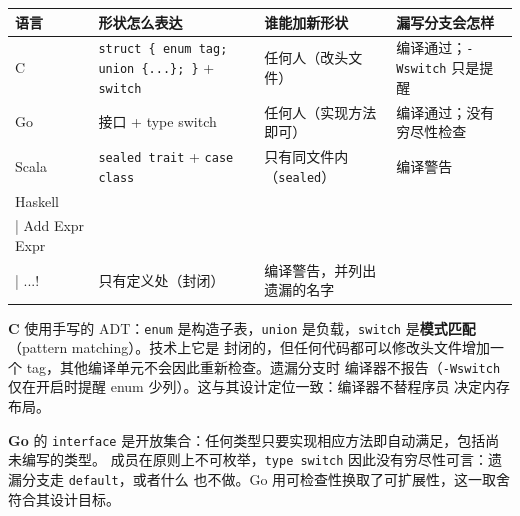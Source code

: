 {\def\LTcaptype{none} %
\begin{longtable}[]{@{}
  >{\raggedright\arraybackslash}p{}
  >{\raggedright\arraybackslash}p{}
  >{\raggedright\arraybackslash}p{}
  >{\raggedright\arraybackslash}p{}@{}}
\toprule\noalign{}
\begin{minipage}[b]{\linewidth}\raggedright
语言
\end{minipage} & \begin{minipage}[b]{\linewidth}\raggedright
形状怎么表达
\end{minipage} & \begin{minipage}[b]{\linewidth}\raggedright
谁能加新形状
\end{minipage} & \begin{minipage}[b]{\linewidth}\raggedright
漏写分支会怎样
\end{minipage} \\
\midrule\noalign{}
\endhead
\bottomrule\noalign{}
\endlastfoot
C & \passthrough{\lstinline!struct \{ enum tag; union \{...\}; \}!} + \passthrough{\lstinline!switch!} & 任何人（改头文件） & 编译通过；\passthrough{\lstinline!-Wswitch!} 只是提醒 \\
Go & 接口 + type switch & 任何人（实现方法即可） & 编译通过；没有穷尽性检查 \\
Scala & \passthrough{\lstinline!sealed trait!} + \passthrough{\lstinline!case class!} & 只有同文件内（\passthrough{\lstinline!sealed!}） & 编译警告 \\
Haskell & \passthrough{\lstinline!data Expr = Lit Int \\| Add Expr Expr \\| ...!} & 只有定义处（封闭） & 编译警告，并列出遗漏的名字 \\
\end{longtable}
}

\textbf{C} 使用手写的 ADT：\passthrough{\lstinline!enum!} 是构造子表，\passthrough{\lstinline!union!} 是负载，\passthrough{\lstinline!switch!} 是\textbf{模式匹配}（pattern matching）。技术上它是
封闭的，但任何代码都可以修改头文件增加一个 tag，其他编译单元不会因此重新检查。遗漏分支时
编译器不报告（\passthrough{\lstinline!-Wswitch!} 仅在开启时提醒 enum 少列）。这与其设计定位一致：编译器不替程序员
决定内存布局。

\textbf{Go} 的 \passthrough{\lstinline!interface!} 是开放集合：任何类型只要实现相应方法即自动满足，包括尚未编写的类型。
成员在原则上不可枚举，\passthrough{\lstinline!type switch!} 因此没有穷尽性可言：遗漏分支走 \passthrough{\lstinline!default!}，或者什么
也不做。Go 用可检查性换取了可扩展性，这一取舍符合其设计目标。


